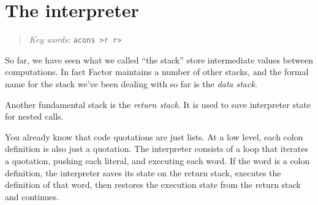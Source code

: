 \documentclass[english]{book}
\newcommand{\chapkeywords}[1]{%
\begin{quote}
\emph{Key words:} \texttt{#1}
\end{quote}
}
\newcommand{\wordtable}[1]{{
\begin{tabularx}{12cm}{|l l X|}
#1
\hline
\end{tabularx}}}
\newcommand{\tabvocab}[1]{
\hline
\multicolumn{3}{|l|}{
\rule[-2mm]{0mm}{6mm}
\texttt{#1} vocabulary:}
\\
\hline
}
\begin{document}
%

\section{The interpreter}

\chapkeywords{acons >r r>}

So far, we have seen what we called ``the stack'' store intermediate values between computations. In fact Factor maintains a number of other stacks, and the formal name for the stack we've been dealing with so far is the \emph{data stack}.

Another fundamental stack is the \emph{return stack}. It is used to save interpreter state for nested calls.

You already know that code quotations are just lists. At a low level, each colon definition is also just a quotation. The interpreter consists of a loop that iterates a quotation, pushing each literal, and executing each word. If the word is a colon definition, the interpreter saves its state on the return stack, executes the definition of that word, then restores the execution state from the return stack and continues.
\end{document}
